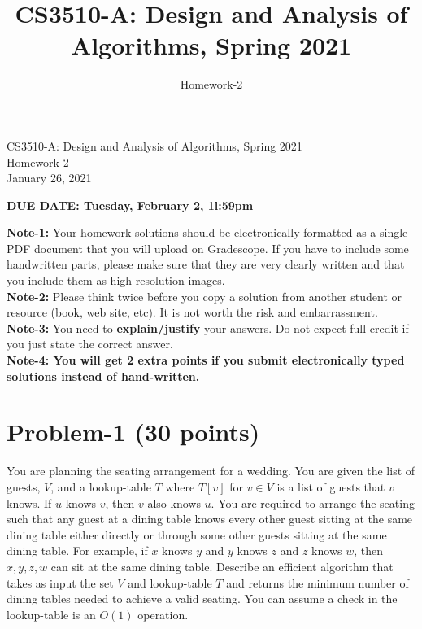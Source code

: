 \documentclass[11pt]{article}
\title{CS3510-A: Design and Analysis of Algorithms, Spring 2021}
\author{Homework-2}
\begin{document}
\begin{center}
    
    \LARGE CS3510-A: Design and Analysis of Algorithms, Spring 2021 \\ \vspace{1em} 
    \large Homework-2 \\ \vspace{0.5em}
    January 26, 2021
\end{center}
\thispagestyle{empty}
\pagestyle{empty}

\noindent
\begin{center}
{\bf DUE DATE: Tuesday, February 2, 1l:59pm}
\end{center}

\noindent
{\bf Note-1:} Your homework solutions should be electronically formatted as a single PDF document that you will upload on Gradescope. 
If you have to include some handwritten parts, please make sure that they are very clearly written and that you include them as high resolution images. \\

\noindent
{\bf Note-2:} Please think twice before you copy a solution from another student or resource (book, web site, etc). 
It is not worth the risk and embarrassment. \\

\noindent
{\bf Note-3:} You need to {\bf explain/justify} your answers. Do not expect full credit if you just state the correct answer. \\

\noindent
{\bf Note-4: You will get 2 extra points if you submit electronically typed solutions instead of hand-written.} 

\newpage
\section*{Problem-1 (30 points)}
You are planning the seating arrangement for a wedding. You are given the list of guests, $V$, and a lookup-table $T$ where $T[v]$ for $v\in V$ is a list of guests that $v$ knows. If $u$ knows $v$, then $v$ also knows $u$. You are required to arrange the seating such that any guest at a dining table knows every other guest sitting at the same dining table either directly or through some other guests sitting at the same dining table. For example, if $x$ knows $y$ and $y$ knows $z$ and $z$ knows $w$, then $x, y, z, w$ can sit at the same dining table. Describe an efficient algorithm that takes as input the set $V$ and lookup-table $T$ and returns the minimum number of dining tables needed to achieve a valid seating. You can assume a check in the lookup-table is an $O(1)$ operation. \\
\end{document}
